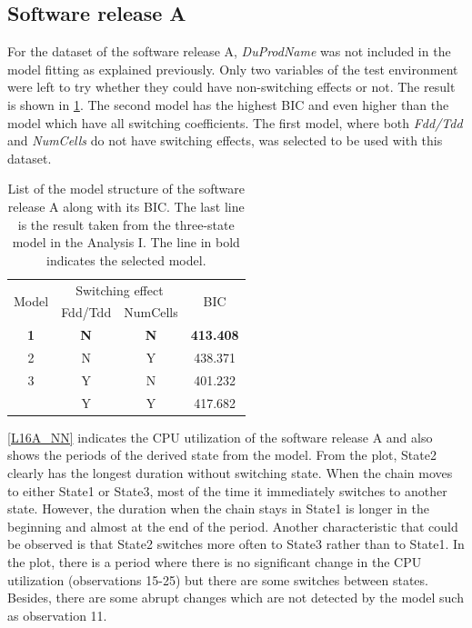 \subsection{Software release A}

For the dataset of the software release A, \emph{DuProdName} was not
included in the model fitting as explained previously. Only two variables
of the test environment were left to try whether they could have non-switching
effects or not. The result is shown in \ref{L16A_switch}. The second
model has the highest BIC and even higher than the model which have
all switching coefficients. The first model, where both \emph{Fdd/Tdd}
and \emph{NumCells} do not have switching effects, was selected to
be used with this dataset. 

\begin{table}[h]
\caption{List of the model structure of the software release A along with its
BIC. The last line is the result taken from the three-state model
in the Analysis I. The line in bold indicates the selected model.}
\label{L16A_switch}
\centering{}%
\begin{tabular}{cccc}
\toprule 
\multirow{2}{*}{Model} & \multicolumn{2}{c}{Switching effect} & \multirow{2}{*}{BIC}\tabularnewline
\cmidrule{2-3} 
 & Fdd/Tdd & NumCells & \tabularnewline
\midrule
\midrule 
\textbf{1} & \textbf{N} & \textbf{N} & \textbf{413.408}\tabularnewline
2 & N & Y & 438.371\tabularnewline
3 & Y & N & 401.232\tabularnewline
\midrule
 & Y & Y & 417.682\tabularnewline
\bottomrule
\end{tabular}
\end{table}

\ref{L16A_NN} indicates the CPU utilization of the software release
A and also shows the periods of the derived state from the model.
From the plot, State2 clearly has the longest duration without switching
state. When the chain moves to either State1 or State3, most of the
time it immediately switches to another state. However, the duration
when the chain stays in State1 is longer in the beginning and almost
at the end of the period. Another characteristic that could be observed
is that State2 switches more often to State3 rather than to State1.
In the plot, there is a period where there is no significant change
in the CPU utilization (observations 15-25) but there are some switches
between states. Besides, there are some abrupt changes which are not
detected by the model such as observation 11. 

